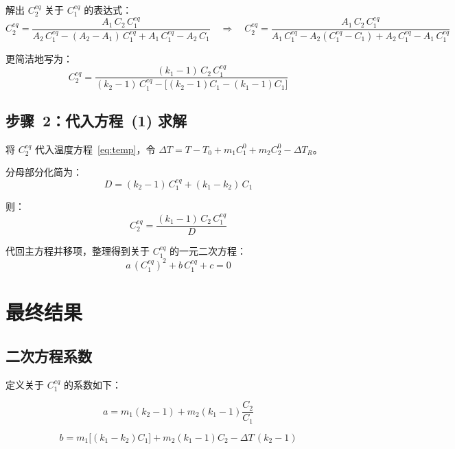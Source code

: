 \documentclass[12pt, a4paper]{article}
\begin{document}
解出 $C_2^{eq}$ 关于 $C_1^{eq}$ 的表达式：
\begin{equation}
  C_2^{eq}
  = \frac{A_1\,C_2\,C_1^{eq}}{A_2\,C_1^{eq} - (A_2 - A_1)\,C_1^{eq} + A_1\,C_1^{eq} - A_2\,C_1}
  \quad \Longrightarrow \quad
  C_2^{eq} = \frac{A_1\,C_2\,C_1^{eq}}{A_1\,C_1^{eq} - A_2(C_1^{eq} - C_1) + A_2\,C_1^{eq} - A_1\,C_1^{eq}}
  \label{eq:C2eq_inter}
\end{equation}

更简洁地写为：
\begin{equation}
  C_2^{eq} = \frac{(k_1-1)\,C_2\,C_1^{eq}}{(k_2-1)\,C_1^{eq} - \bigl[(k_2-1)C_1 - (k_1-1)C_1\bigr]}
  \label{eq:C2eq}
\end{equation}

\subsection{步骤~2：代入方程~(1) 求解}

将 $C_2^{eq}$ 代入温度方程~\eqref{eq:temp}，令 $\Delta T = T - T_0 + m_1 C_1^0 + m_2 C_2^0 - \Delta T_R$。

分母部分化简为：
\[
  D = (k_2 - 1)\,C_1^{eq} + (k_1 - k_2)\,C_1
\]

则：
\[
  C_2^{eq} = \frac{(k_1-1)\,C_2\,C_1^{eq}}{D}
\]

代回主方程并移项，整理得到关于 $C_1^{eq}$ 的一元二次方程：
\begin{equation}
  a\,\left(C_1^{eq}\right)^2 + b\,C_1^{eq} + c = 0
  \label{eq:quadratic}
\end{equation}

\section{最终结果}

\subsection{二次方程系数}

定义关于 $C_1^{eq}$ 的系数如下：

\begin{equation}
  a = m_1(k_2-1) + m_2(k_1-1)\frac{C_2}{C_1}
  \label{eq:coef_a}
\end{equation}

\begin{equation}
  b = m_1\bigl[(k_1-k_2)C_1\bigr] + m_2(k_1-1)C_2 - \Delta T\,(k_2-1)
  \label{eq:coef_b}
\end{equation}
\end{document}
